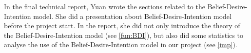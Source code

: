 In the final technical report, Yuan wrote the sections related to the Belief-Desire-Intention model.
She did a presentation about Belief-Desire-Intention model before the project start.
In the report, she did not only introduce the theory of the Belief-Desire-Intention model (see \autoref{fun:BDI}), but also did some statistics to analyse the use of the Belief-Desire-Intention model in our project (see \autoref{imp}).
